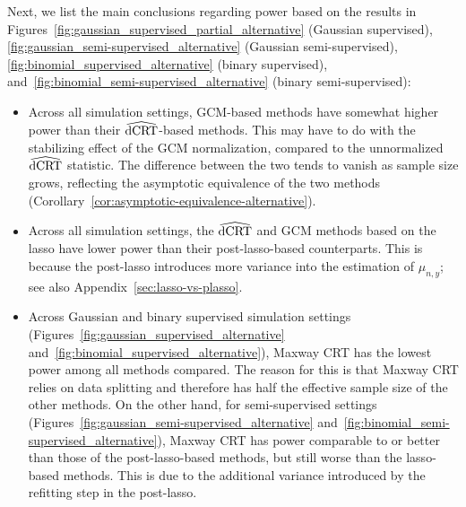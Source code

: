 \documentclass[aos]{imsart}
\theoremstyle{plain}
\theoremstyle{remark}
\newcommand{\dCRThat}{\widehat{\textnormal{dCRT}}}		%
\begin{document}
Next, we list the main conclusions regarding power based on the results in Figures~\ref{fig:gaussian_supervised_partial_alternative} (Gaussian supervised), \ref{fig:gaussian_semi-supervised_alternative} (Gaussian semi-supervised), \ref{fig:binomial_supervised_alternative} (binary supervised), and~\ref{fig:binomial_semi-supervised_alternative} (binary semi-supervised): 
\begin{itemize}
    \item Across all simulation settings, GCM-based methods have somewhat higher power than their $\dCRThat$-based methods. This may have to do with the stabilizing effect of the GCM normalization, compared to the unnormalized $\dCRThat$ statistic. The difference between the two tends to vanish as sample size grows, reflecting the asymptotic equivalence of the two methods (Corollary~\ref{cor:asymptotic-equivalence-alternative}).
    \item Across all simulation settings, the $\dCRThat$ and GCM methods based on the lasso have lower power than their post-lasso-based counterparts. This is because the post-lasso introduces more variance into the estimation of $\mu_{n,y}$; see also Appendix~\ref{sec:lasso-vs-plasso}.
    \item Across Gaussian and binary supervised simulation settings (Figures~\ref{fig:gaussian_supervised_alternative} and~\ref{fig:binomial_supervised_alternative}), Maxway CRT has the lowest power among all methods compared. The reason for this is that Maxway CRT relies on data splitting and therefore has half the effective sample size of the other methods. On the other hand, for semi-supervised settings (Figures~\ref{fig:gaussian_semi-supervised_alternative} and~\ref{fig:binomial_semi-supervised_alternative}), Maxway CRT has power comparable to or better than those of the post-lasso-based methods, but still worse than the lasso-based methods. This is due to the additional variance introduced by the refitting step in the post-lasso.
\end{itemize}
\end{document}

